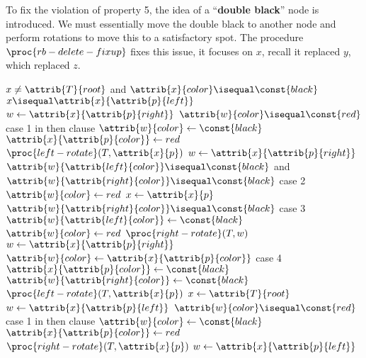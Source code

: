 \documentclass[12pt]{article}
\begin{document}
To fix the violation of property 5, the idea of a ``\textbf{double black}'' node is introduced. We must essentially move the double black to another node and perform rotations to move this to a satisfactory spot. The procedure $\proc{rb-delete-fixup}$ fixes this issue, it focuses on $x$, recall it replaced $y$, which replaced $z$.

\begin{codebox}
\li \While $x \neq \attrib{T}{root}$ and $\attrib{x}{color} \isequal \const{black}$
\li \Do
        \If $x \isequal \attrib{x}{\attrib{p}{left}}$
\li     \Then
            $w \gets{\attrib{x}{\attrib{p}{right}}}$
\li         \If $\attrib{w}{color} \isequal \const{red}$ \Comment case 1 in then clause
\li         \Then
                $\attrib{w}{color} \gets{\const{black}}$
\li             $\attrib{x}{\attrib{p}{color}} \gets{red }$
\li             $\proc{left-rotate}(T, \attrib{x}{p})$
\li             $w \gets{\attrib{x}{\attrib{p}{right}}}$
            \End
\li         \If $\attrib{w}{\attrib{left}{color}} \isequal \const{black}$ and $\attrib{w}{\attrib{right}{color}} \isequal \const{black}$ \Comment case 2
\li         \Then
                $\attrib{w}{color} \gets{red}$
\li             $x \gets{\attrib{x}{p}}$
\li         \Else
\li             \If $\attrib{w}{\attrib{right}{color}} \isequal \const{black}$ \Comment case 3
\li             \Then
                    $\attrib{w}{\attrib{left}{color}} \gets{\const{black}}$
\li                 $\attrib{w}{color} \gets{red}$
\li                 $\proc{right-rotate}(T, w)$
\li                 $w \gets{\attrib{x}{\attrib{p}{right}}}$
                \End
\li             $\attrib{w}{color} \gets{\attrib{x}{\attrib{p}{color}}}$ \Comment case 4
\li             $\attrib{x}{\attrib{p}{color}} \gets{\const{black}}$
\li             $\attrib{w}{\attrib{right}{color}} \gets{\const{black}}$
\li             $\proc{left-rotate}(T, \attrib{x}{p})$
\li             $x \gets{\attrib{T}{root}}$
            \End
\li     \Else
\li         $w \gets{\attrib{x}{\attrib{p}{left}}}$
\li         \If $\attrib{w}{color} \isequal \const{red}$ \Comment case 1 in then clause
\li         \Then
                $\attrib{w}{color} \gets{\const{black}}$
\li             $\attrib{x}{\attrib{p}{color}} \gets{red }$
\li             $\proc{right-rotate}(T, \attrib{x}{p})$
\li             $w \gets{\attrib{x}{\attrib{p}{left}}}$

\end{codebox}
\end{document}
